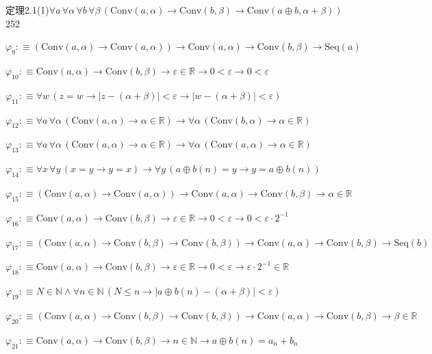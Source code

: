 \begin{fullproof}{定理2.1(1)}{$\forall a\,\forall \alpha\,\forall b\,\forall \beta\,(\mathrm{Conv}(a,\alpha) \to \mathrm{Conv}(b,\beta) \to \mathrm{Conv}(a \oplus b,\alpha + \beta))$}{252}
\begin{abbrevlist}
\item $\varphi_{9} :\equiv (\mathrm{Conv}(a,\alpha) \to \mathrm{Conv}(a,\alpha)) \to \mathrm{Conv}(a,\alpha) \to \mathrm{Conv}(b,\beta) \to \mathrm{Seq}(a)$
\item $\varphi_{10} :\equiv \mathrm{Conv}(a,\alpha) \to \mathrm{Conv}(b,\beta) \to \varepsilon \in \mathbb{R} \to 0 < \varepsilon \to 0 < \varepsilon$
\item $\varphi_{11} :\equiv \forall w\,(z = w \to \lvert z - (\alpha + \beta) \rvert < \varepsilon \to \lvert w - (\alpha + \beta) \rvert < \varepsilon)$
\item $\varphi_{12} :\equiv \forall a\,\forall \alpha\,(\mathrm{Conv}(a,\alpha) \to \alpha \in \mathbb{R}) \to \forall \alpha\,(\mathrm{Conv}(b,\alpha) \to \alpha \in \mathbb{R})$
\item $\varphi_{13} :\equiv \forall a\,\forall \alpha\,(\mathrm{Conv}(a,\alpha) \to \alpha \in \mathbb{R}) \to \forall \alpha\,(\mathrm{Conv}(a,\alpha) \to \alpha \in \mathbb{R})$
\item $\varphi_{14} :\equiv \forall x\,\forall y\,(x = y \to y = x) \to \forall y\,(a \oplus b(n) = y \to y = a \oplus b(n))$
\item $\varphi_{15} :\equiv (\mathrm{Conv}(a,\alpha) \to \mathrm{Conv}(a,\alpha)) \to \mathrm{Conv}(a,\alpha) \to \mathrm{Conv}(b,\beta) \to \alpha \in \mathbb{R}$
\item $\varphi_{16} :\equiv \mathrm{Conv}(a,\alpha) \to \mathrm{Conv}(b,\beta) \to \varepsilon \in \mathbb{R} \to 0 < \varepsilon \to 0 < \varepsilon \cdot 2^{-1}$
\item $\varphi_{17} :\equiv (\mathrm{Conv}(a,\alpha) \to \mathrm{Conv}(b,\beta) \to \mathrm{Conv}(b,\beta)) \to \mathrm{Conv}(a,\alpha) \to \mathrm{Conv}(b,\beta) \to \mathrm{Seq}(b)$
\item $\varphi_{18} :\equiv \mathrm{Conv}(a,\alpha) \to \mathrm{Conv}(b,\beta) \to \varepsilon \in \mathbb{R} \to 0 < \varepsilon \to \varepsilon \cdot 2^{-1} \in \mathbb{R}$
\item $\varphi_{19} :\equiv N \in \mathbb{N} \land \forall n \in \mathbb{N}\,(N \leq n \to \lvert a \oplus b(n) - (\alpha + \beta) \rvert < \varepsilon)$
\item $\varphi_{20} :\equiv (\mathrm{Conv}(a,\alpha) \to \mathrm{Conv}(b,\beta) \to \mathrm{Conv}(b,\beta)) \to \mathrm{Conv}(a,\alpha) \to \mathrm{Conv}(b,\beta) \to \beta \in \mathbb{R}$
\item $\varphi_{21} :\equiv \mathrm{Conv}(a,\alpha) \to \mathrm{Conv}(b,\beta) \to n \in \mathbb{N} \to a \oplus b(n) = a_{n} + b_{n}$

\end{abbrevlist}
\end{fullproof}
